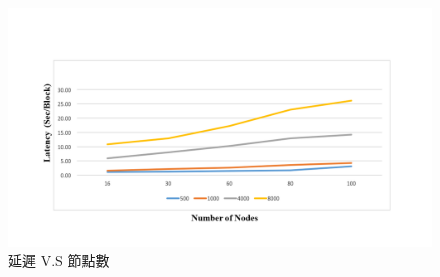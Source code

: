 \begin{figure}[h]
\centering
\includegraphics[scale=0.55]{images/62.png}
\caption{延遲 V.S 節點數}
\label{i:byz-latency}
\end{figure}
